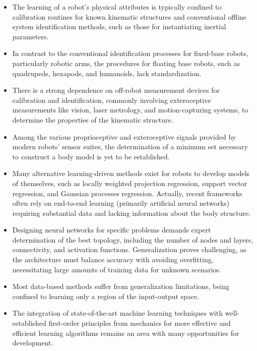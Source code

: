 \documentclass[12pt, a4paper]{article}
\begin{document}
\begin{itemize}
\item The learning of a robot's physical attributes is typically confined to calibration routines for known kinematic structures and conventional offline system identification methods, such as those for instantiating inertial parameters.

\item In contrast to the conventional identification processes for fixed-base robots, particularly robotic arms, the procedures for floating base robots, such as quadrupeds, hexapods, and humanoids, lack standardization.

\item There is a strong dependence on off-robot measurement devices for calibration and identification, commonly involving exteroceptive measurements like vision, laser metrology, and motion-capturing systems, to determine the properties of the kinematic structure.

\item Among the various proprioceptive and exteroceptive signals provided by modern robots' sensor suites, the determination of a minimum set necessary to construct a body model is yet to be established.

\item Many alternative learning-driven methods exist for robots to develop models of themselves, such as locally weighted projection regression, support vector regression, and Gaussian processes regression. Actually, recent frameworks often rely on end-to-end learning (primarily artificial neural networks) requiring substantial data and lacking information about the body structure.

\item Designing neural networks for specific problems demands expert determination of the best topology, including the number of nodes and layers, connectivity, and activation functions. Generalization proves challenging, as the architecture must balance accuracy with avoiding overfitting, necessitating large amounts of training data for unknown scenarios.

\item Most data-based methods suffer from generalization limitations, being confined to learning only a region of the input-output space.

\item The integration of state-of-the-art machine learning techniques with well-established first-order principles from mechanics for more effective and efficient learning algorithms remains an area with many opportunities for development.


\end{itemize}
\end{document}
